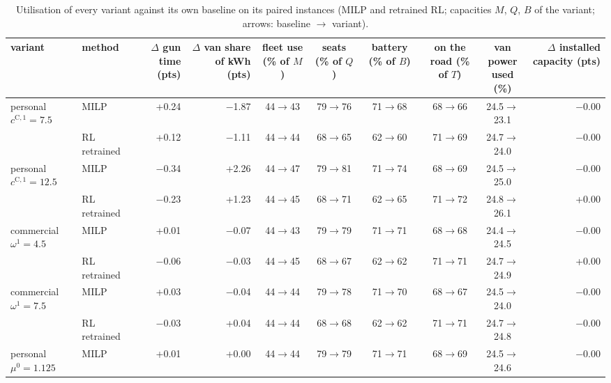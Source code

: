 \begin{table}[H]\centering
\scriptsize
\caption{Utilisation of every variant against its own baseline on its paired instances (MILP and retrained RL; capacities $M$, $Q$, $B$ of the variant; arrows: baseline $\to$ variant).}\label{tab:utilexp}
\begin{adjustbox}{max width=\textwidth}\begin{tabular}{llrrcccccr}\toprule
variant & method & \shortstack{$\Delta$ gun time\\(pts)} & \shortstack{$\Delta$ van share\\of kWh (pts)} & \shortstack{fleet use\\(\% of $M$)} & \shortstack{seats\\(\% of $Q$)} & \shortstack{battery\\(\% of $B$)} & \shortstack{on the road\\(\% of $T$)} & \shortstack{van power\\used (\%)} & \shortstack{$\Delta$ installed\\capacity (pts)} \\ \midrule
personal $c^{\mathrm C,1}=7.5$ & MILP & +0.24 & $-$1.87 & 44$\to$43 & 79$\to$76 & 71$\to$68 & 68$\to$66 & 24.5$\to$23.1 & $-$0.00 \\
 & RL retrained & +0.12 & $-$1.11 & 44$\to$44 & 68$\to$65 & 62$\to$60 & 71$\to$69 & 24.7$\to$24.0 & $-$0.00 \\
personal $c^{\mathrm C,1}=12.5$ & MILP & $-$0.34 & +2.26 & 44$\to$47 & 79$\to$81 & 71$\to$74 & 68$\to$69 & 24.5$\to$25.0 & $-$0.00 \\
 & RL retrained & $-$0.23 & +1.23 & 44$\to$45 & 68$\to$71 & 62$\to$65 & 71$\to$72 & 24.8$\to$26.1 & +0.00 \\
commercial $\omega^{1}=4.5$ & MILP & +0.01 & $-$0.07 & 44$\to$43 & 79$\to$79 & 71$\to$71 & 68$\to$68 & 24.4$\to$24.5 & $-$0.00 \\
 & RL retrained & $-$0.06 & $-$0.03 & 44$\to$45 & 68$\to$67 & 62$\to$62 & 71$\to$71 & 24.7$\to$24.9 & +0.00 \\
commercial $\omega^{1}=7.5$ & MILP & +0.03 & $-$0.04 & 44$\to$44 & 79$\to$78 & 71$\to$70 & 68$\to$67 & 24.5$\to$24.0 & $-$0.00 \\
 & RL retrained & $-$0.03 & +0.04 & 44$\to$44 & 68$\to$68 & 62$\to$62 & 71$\to$71 & 24.7$\to$24.8 & $-$0.00 \\
personal $\mu^{0}=1.125$ & MILP & +0.01 & +0.00 & 44$\to$44 & 79$\to$79 & 71$\to$71 & 68$\to$69 & 24.5$\to$24.6 & $-$0.00 \\

\end{tabular}
\end{adjustbox}
\end{table}
